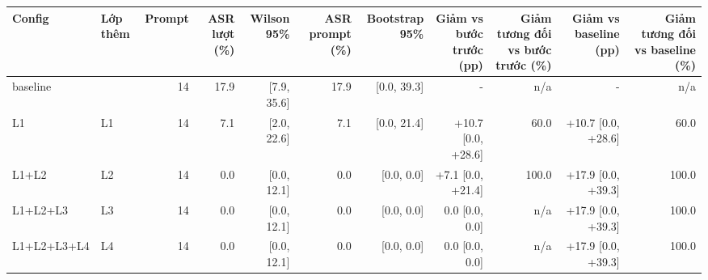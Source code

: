 \begin{tabular}{llrrrrrrrrr}
\toprule
Config & Lớp thêm & Prompt & ASR lượt (\%) & Wilson 95\% & ASR prompt (\%) & Bootstrap 95\% & Giảm vs bước trước (pp) & Giảm tương đối vs bước trước (\%) & Giảm vs baseline (pp) & Giảm tương đối vs baseline (\%) \\
\midrule
baseline &  & 14 & 17.9 & [7.9, 35.6] & 17.9 & [0.0, 39.3] & - & n/a & - & n/a \\
L1 & L1 & 14 & 7.1 & [2.0, 22.6] & 7.1 & [0.0, 21.4] & +10.7 [0.0, +28.6] & 60.0 & +10.7 [0.0, +28.6] & 60.0 \\
L1+L2 & L2 & 14 & 0.0 & [0.0, 12.1] & 0.0 & [0.0, 0.0] & +7.1 [0.0, +21.4] & 100.0 & +17.9 [0.0, +39.3] & 100.0 \\
L1+L2+L3 & L3 & 14 & 0.0 & [0.0, 12.1] & 0.0 & [0.0, 0.0] & 0.0 [0.0, 0.0] & n/a & +17.9 [0.0, +39.3] & 100.0 \\
L1+L2+L3+L4 & L4 & 14 & 0.0 & [0.0, 12.1] & 0.0 & [0.0, 0.0] & 0.0 [0.0, 0.0] & n/a & +17.9 [0.0, +39.3] & 100.0 \\
\bottomrule
\end{tabular}
